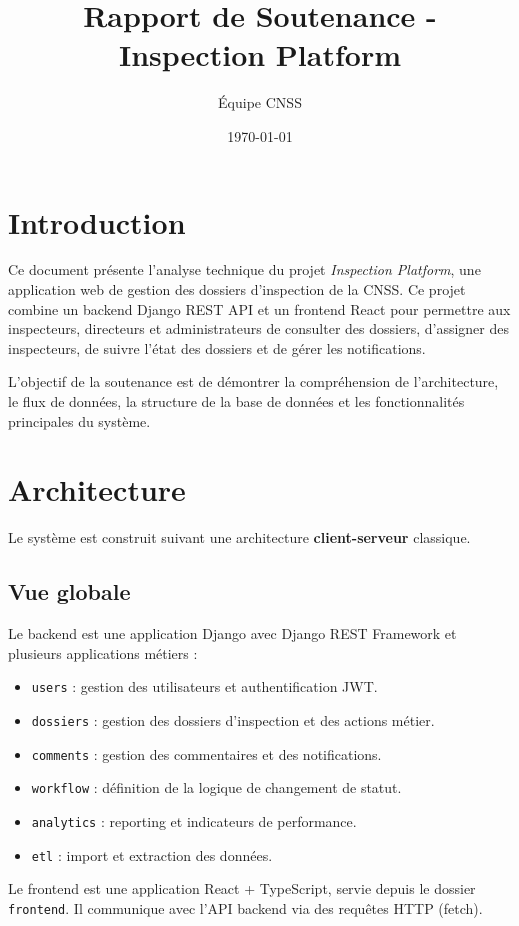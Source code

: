 \documentclass[12pt,a4paper]{article}
\title{Rapport de Soutenance - Inspection Platform}
\author{Équipe CNSS}
\date{\today}
\begin{document}
\maketitle
\tableofcontents
\newpage

\section{Introduction}
Ce document présente l’analyse technique du projet \textit{Inspection Platform}, une application web de gestion des dossiers d’inspection de la CNSS. Ce projet combine un backend Django REST API et un frontend React pour permettre aux inspecteurs, directeurs et administrateurs de consulter des dossiers, d’assigner des inspecteurs, de suivre l’état des dossiers et de gérer les notifications.

L'objectif de la soutenance est de démontrer la compréhension de l'architecture, le flux de données, la structure de la base de données et les fonctionnalités principales du système.

\section{Architecture}
Le système est construit suivant une architecture \textbf{client-serveur} classique.

\subsection{Vue globale}
Le backend est une application Django avec Django REST Framework et plusieurs applications métiers :
\begin{itemize}
    \item \texttt{users} : gestion des utilisateurs et authentification JWT.
    \item \texttt{dossiers} : gestion des dossiers d’inspection et des actions métier.
    \item \texttt{comments} : gestion des commentaires et des notifications.
    \item \texttt{workflow} : définition de la logique de changement de statut.
    \item \texttt{analytics} : reporting et indicateurs de performance.
    \item \texttt{etl} : import et extraction des données.
\end{itemize}

Le frontend est une application React + TypeScript, servie depuis le dossier \texttt{frontend}. Il communique avec l’API backend via des requêtes HTTP (fetch).
\end{document}
